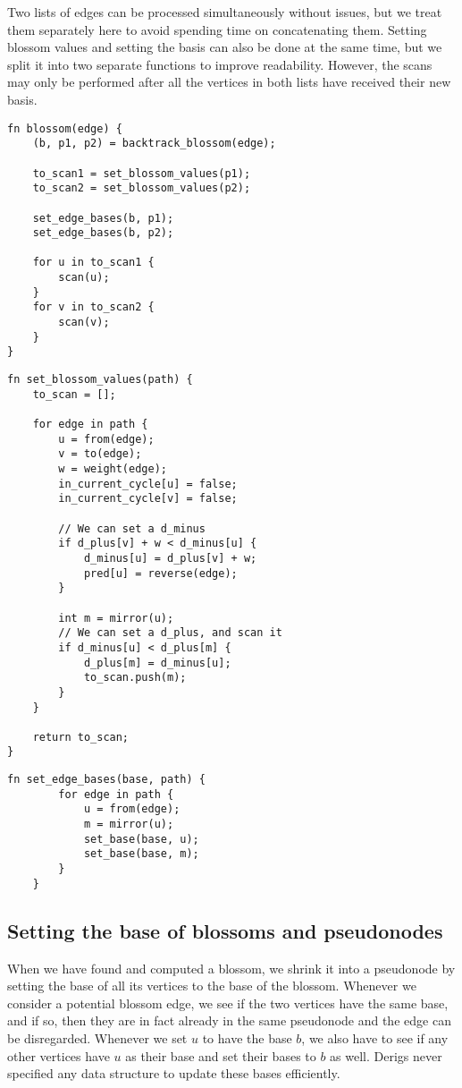 Two lists of edges can be processed simultaneously without issues, but we treat them separately here to avoid spending time on concatenating them. Setting blossom values and setting the basis can also be done at the same time, but we split it into two separate functions to improve readability. However, the scans may only be performed after all the vertices in both lists have received their new basis.
\begin{lstlisting}[caption={Blossom},label=Listing,mathescape=true]
fn blossom(edge) {
    (b, p1, p2) = backtrack_blossom(edge);

    to_scan1 = set_blossom_values(p1);
    to_scan2 = set_blossom_values(p2);

    set_edge_bases(b, p1);
    set_edge_bases(b, p2);

    for u in to_scan1 {
        scan(u);
    }
    for v in to_scan2 {
        scan(v);
    }
}
\end{lstlisting}

\begin{lstlisting}[caption={Set blossom values},label=Listing,mathescape=true]
fn set_blossom_values(path) {
    to_scan = [];

    for edge in path {
        u = from(edge);
        v = to(edge);
        w = weight(edge);
        in_current_cycle[u] = false;
        in_current_cycle[v] = false;

        // We can set a d_minus
        if d_plus[v] + w < d_minus[u] {
            d_minus[u] = d_plus[v] + w;
            pred[u] = reverse(edge);
        }

        int m = mirror(u);
        // We can set a d_plus, and scan it
        if d_minus[u] < d_plus[m] {
            d_plus[m] = d_minus[u];
            to_scan.push(m);
        }
    }

    return to_scan;
}
\end{lstlisting}

\begin{lstlisting}[caption={Set edge bases},label=Listing,mathescape=true]
    fn set_edge_bases(base, path) {
        for edge in path {
            u = from(edge);
            m = mirror(u);
            set_base(base, u);
            set_base(base, m);
        }
    }
    \end{lstlisting}

\subsection{Setting the base of blossoms and pseudonodes}
\label{subsection:basis-code}
When we have found and computed a blossom, we shrink it into a pseudonode by setting the base of all its vertices to the base of the blossom. Whenever we consider a potential blossom edge, we see if the two vertices have the same base, and if so, then they are in fact already in the same pseudonode and the edge can be disregarded. Whenever we set $u$ to have the base $b$, we also have to see if any other vertices have $u$ as their base and set their bases to $b$ as well. Derigs never specified any data structure to update these bases efficiently.

